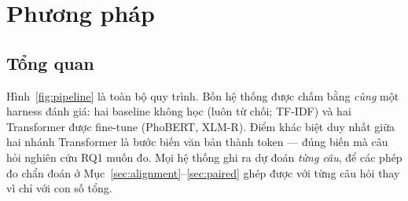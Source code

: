 \section{Phương pháp}
\label{sec:method}

\subsection{Tổng quan}
\label{sec:overview}

Hình~\ref{fig:pipeline} là toàn bộ quy trình. Bốn hệ thống được chấm bằng \emph{cùng} một
harness đánh giá: hai baseline không học (luôn từ chối; TF-IDF) và hai Transformer được
fine-tune (PhoBERT, XLM-R). Điểm khác biệt duy nhất giữa hai nhánh Transformer là bước biến
văn bản thành token --- đúng biến mà câu hỏi nghiên cứu RQ1 muốn đo. Mọi hệ thống ghi ra dự
đoán \emph{từng câu}, để các phép đo chẩn đoán ở Mục~\ref{sec:alignment}--\ref{sec:paired}
ghép được với từng câu hỏi thay vì chỉ với con số tổng.

